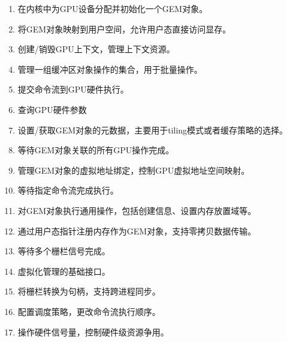 \begin{enumerate}[label=\arabic*.]
  \item 在内核中为GPU设备分配并初始化一个GEM对象。
  \item 将GEM对象映射到用户空间，允许用户态直接访问显存。
  \item 创建/销毁GPU上下文，管理上下文资源。
  \item 管理一组缓冲区对象操作的集合，用于批量操作。
  \item 提交命令流到GPU硬件执行。
  \item 查询GPU硬件参数
  \item 设置/获取GEM对象的元数据，主要用于tiling模式或者缓存策略的选择。
  \item 等待GEM对象关联的所有GPU操作完成。
  \item 管理GEM对象的虚拟地址绑定，控制GPU虚拟地址空间映射。
  \item 等待指定命令流完成执行。
  \item 对GEM对象执行通用操作，包括创建信息、设置内存放置域等。
  \item 通过用户态指针注册内存作为GEM对象，支持零拷贝数据传输。
  \item 等待多个栅栏信号完成。
  \item 虚拟化管理的基础接口。
  \item 将栅栏转换为句柄，支持跨进程同步。
  \item 配置调度策略，更改命令流执行顺序。
  \item 操作硬件信号量，控制硬件级资源争用。
\end{enumerate}

